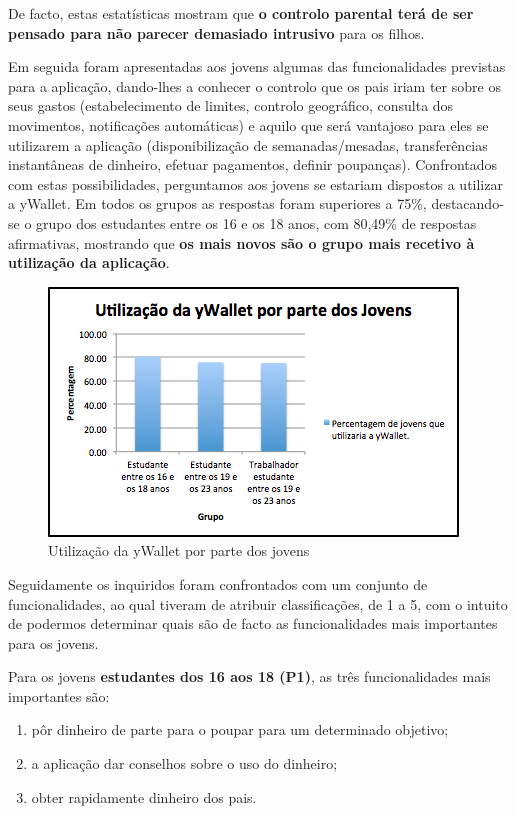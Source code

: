 \documentclass[12pt,a4paper]{article}
\begin{document}
      De facto, estas estatísticas mostram que \textbf{o controlo parental terá de ser pensado para não parecer demasiado intrusivo} para os filhos.

      Em seguida foram apresentadas aos jovens algumas das funcionalidades previstas para a aplicação, dando-lhes a conhecer o controlo que os pais iriam ter sobre os seus gastos (estabelecimento de limites, controlo geográfico, consulta dos movimentos, notificações automáticas) e aquilo que será vantajoso para eles se utilizarem a aplicação (disponibilização de semanadas/mesadas, transferências instantâneas de dinheiro, efetuar pagamentos, definir poupanças). Confrontados com estas possibilidades, perguntamos aos jovens se estariam dispostos a utilizar a yWallet. Em todos os grupos as respostas foram superiores a 75\%, destacando-se o grupo dos estudantes entre os 16 e os 18 anos, com 80,49\% de respostas afirmativas, mostrando que \textbf{os mais novos são o grupo mais recetivo à utilização da aplicação}.

      \begin{figure}[ht!]
        \centering
          \includegraphics[width=0.7\linewidth]{img/img5}
          \caption{Utilização da yWallet por parte dos jovens}
          \label{img5}
      \end{figure} 

      Seguidamente os inquiridos foram confrontados com um conjunto de funcionalidades, ao qual tiveram de atribuir classificações, de 1 a 5, com o intuito de podermos determinar quais são de facto as funcionalidades mais importantes para os jovens.

      Para os jovens \textbf{estudantes dos 16 aos 18 (P1)}, as três funcionalidades mais importantes são:

      \begin{enumerate}
        \item pôr dinheiro de parte para o poupar para um determinado objetivo;
        \item a aplicação dar conselhos sobre o uso do dinheiro;
        \item obter rapidamente dinheiro dos pais.
      \end{enumerate}
\end{document}
